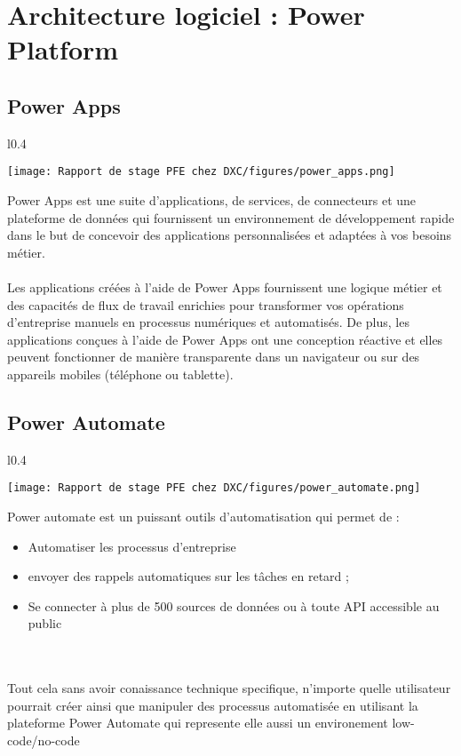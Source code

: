 \section{Architecture logiciel : Power Platform }

\subsection{Power Apps }
\vspace{0.5cm}

\begin{wrapfigure}{l}{0.4\textwidth}
  \begin{center}
    \texttt{[image: Rapport de stage PFE chez DXC/figures/power\_apps.png]}
  \end{center}
\end{wrapfigure}

Power Apps est une suite d’applications, de services, de connecteurs et une plateforme de données qui fournissent un environnement de développement rapide dans le but de concevoir des applications personnalisées et adaptées à vos besoins métier.
\\
\\
Les applications créées à l’aide de Power Apps fournissent une logique métier et des capacités de flux de travail enrichies pour transformer vos opérations d’entreprise manuels en processus numériques et automatisés. De plus, les applications conçues à l’aide de Power Apps ont une conception réactive et elles peuvent fonctionner de manière transparente dans un navigateur ou sur des appareils mobiles (téléphone ou tablette).


\subsection{Power Automate }

\begin{wrapfigure}{l}{0.4\textwidth}
  \begin{center}
    \texttt{[image: Rapport de stage PFE chez DXC/figures/power\_automate.png]}
  \end{center}
\end{wrapfigure}

Power automate est un puissant outils d'automatisation qui permet de :
\begin{itemize}
  \item Automatiser les processus d’entreprise
  \item envoyer des rappels automatiques sur les tâches en retard ;
  \item Se connecter à plus de 500 sources de données ou à toute API accessible au public
\end{itemize}
\\ 
\\
Tout cela sans avoir conaissance technique specifique, n'importe quelle utilisateur pourrait créer ainsi que manipuler des processus automatisée en utilisant la plateforme Power Automate qui represente elle aussi un environement low-code/no-code

